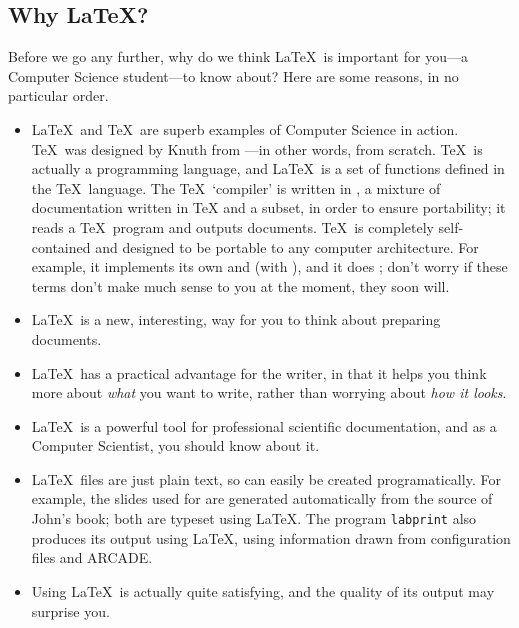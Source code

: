 \begin{refsection}
\section{Why \LaTeX?}
\label{sec:why}
 Before we go any further, why do we think \LaTeX\ is important for you---a Computer Science student---to know about? Here are some reasons, in no particular order.

\begin{itemize}
\item \LaTeX\ and \TeX\ are superb examples of Computer Science in action. \TeX\ was designed by Knuth from ---in other words, from scratch.  \TeX\ is actually a programming language, and \LaTeX\ is a set of functions defined in the \TeX\ language. The \TeX\ `compiler'  is  written in , a mixture of documentation written in TeX and a  subset, in order to ensure portability; it reads a \TeX\ program and outputs documents. \TeX\ is completely self-contained and designed to be portable to any computer architecture. For example, it implements its own  and  (with ), and it does ; don't worry if these terms don't make much sense to you at the moment, they soon will. 
\item \LaTeX\ is a new, interesting, way for you to think about preparing documents. 
\item \LaTeX\ has a practical advantage for the writer, in that it helps you think more about \emph{what} you want to write, rather than worrying about \emph{how it looks}.
\item \LaTeX\ is a powerful tool for professional scientific documentation, and as a Computer Scientist, you should know about it.
\item \LaTeX\ files are just plain text, so can easily be created programatically. For example,  the slides used for  are generated automatically from the source of John's book; both are typeset using \LaTeX. The program \texttt{labprint} also produces its output using \LaTeX, using information drawn from  configuration files and ARCADE.
  
\item Using \LaTeX\ is actually quite satisfying, and the quality of its output may surprise you.
\end{itemize}


\end{refsection}
